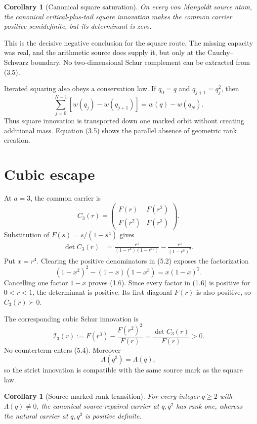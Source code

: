 \documentclass[11pt]{article}
\newtheorem{corollary}[theorem]{Corollary}
\theoremstyle{definition}
\theoremstyle{remark}
\newcommand{\LambdaVM}{\Lambda}
\newcommand{\pd}{\succ 0}
\begin{document}
\begin{corollary}[Canonical square saturation]
\label{cor:saturation}
On every von Mangoldt source atom, the canonical critical-plus-tail square innovation makes the
common carrier positive semidefinite, but its determinant is zero.
\end{corollary}

This is the decisive negative conclusion for the square route.  The missing capacity was real,
and the arithmetic source does supply it, but only at the Cauchy--Schwarz boundary.  No
two-dimensional Schur complement can be extracted from (3.5).

Iterated squaring also obeys a conservation law.  If $q_0=q$ and $q_{j+1}=q_j^2$, then
\[
 \sum_{j=0}^{N-1}[w(q_j)-w(q_{j+1})]
 =w(q)-w(q_N).                                         \tag{4.4}
\]
Thus square innovation is transported down one marked orbit without creating additional mass.
Equation (3.5) shows the parallel absence of geometric rank creation.

\section{Cubic escape}

At $a=3$, the common carrier is
\[
 C_3(r)=
 \begin{pmatrix}
 F(r)&F(r^2)\\
 F(r^2)&F(r^3)
 \end{pmatrix}.                                       \tag{5.1}
\]
Substitution of $F(s)=s/(1-s^4)$ gives
\begin{align}
 \det C_3(r)
 &=
 \frac{r^4}{(1-r^4)(1-r^{12})}
 -\frac{r^4}{(1-r^8)^2}.                              \tag{5.2}
\end{align}
Put $x=r^4$.  Clearing the positive denominators in (5.2) exposes the factorization
\[
 (1-x^2)^2-(1-x)(1-x^3)=x(1-x)^2.                     \tag{5.3}
\]
Cancelling one factor $1-x$ proves (1.6).  Since every factor in (1.6) is positive for
$0<r<1$, the determinant is positive.  Its first diagonal $F(r)$ is also positive, so
$C_3(r)\pd$.

The corresponding cubic Schur innovation is
\[
 \mathcal I_3(r)
 :=F(r^3)-\frac{F(r^2)^2}{F(r)}
 =\frac{\det C_3(r)}{F(r)}>0.                          \tag{5.4}
\]
No counterterm enters (5.4).  Moreover
\[
 \LambdaVM(q^3)=\LambdaVM(q),                          \tag{5.5}
\]
so the strict innovation is compatible with the same source mark as the square law.

\begin{corollary}[Source-marked rank transition]
For every integer $q\geq2$ with $\LambdaVM(q)\neq0$, the canonical source-repaired carrier at
$q,q^2$ has rank one, whereas the natural carrier at $q,q^3$ is positive definite.
\end{corollary}
\end{document}
